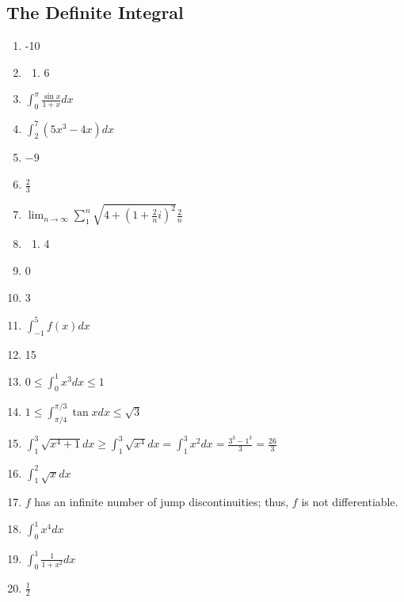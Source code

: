 \documentclass{article} \usepackage[margin=1in]{geometry}
\begin{document}
\subsection{The Definite Integral}
\begin{enumerate}
	\item -10 \setcounter{enumi}{4}
	\item
	      \begin{enumerate}
		      \item 6
	      \end{enumerate}
	      \setcounter{enumi}{16}
	\item $\int_{0}^{\pi}\frac{\sin x}{1+x}dx$ \setcounter{enumi}{18}
	\item $\int_{2}^{7}(5x^3-4x)dx$ \setcounter{enumi}{20}
	\item $-9$ \setcounter{enumi}{22}
	\item $\frac{2}{3}$ \setcounter{enumi}{28}
	\item
	      $\lim_{n\to\infty}\sum_{1}^{n}\sqrt{4+\left(1+\frac{2}{n}i\right)^2}\frac{2}{n}$
	      \setcounter{enumi}{32}
	\item
	      \begin{enumerate}
		      \item 4
	      \end{enumerate}
	      \setcounter{enumi}{40}
	\item 0 \setcounter{enumi}{42}
	\item 3 \setcounter{enumi}{46}
	\item $\int_{-1}^{5}f(x)dx$ \setcounter{enumi}{52}
	\item 15 \setcounter{enumi}{58}
	\item $0\le\int_{0}^{1}x^3dx\le1$ \setcounter{enumi}{60}
	\item $1\le\int_{\pi/4}^{\pi/3}\tan{x}dx\le\sqrt{3}$
	      \setcounter{enumi}{64}
	\item
	      $\int_{1}^{3}\sqrt{x^4+1}dx\ge\int_{1}^{3}\sqrt{x^4}dx=\int_{1}^{3}x^2dx=\frac{3^3-1^3}{3}
		      =\frac{26}{3}$ \setcounter{enumi}{66}
	\item $\int_{1}^{2}\sqrt{x}dx$ \setcounter{enumi}{70}
	\item $f$ has an infinite number of jump discontinuities; thus, $f$ is
	      not differentiable.  \setcounter{enumi}{72}
	\item $\int_{0}^{1}x^4dx$
	\item $\int_{0}^{1}\frac{1}{1+x^2}dx$
	\item $\frac{1}{2}$
\end{enumerate}
\end{document}
